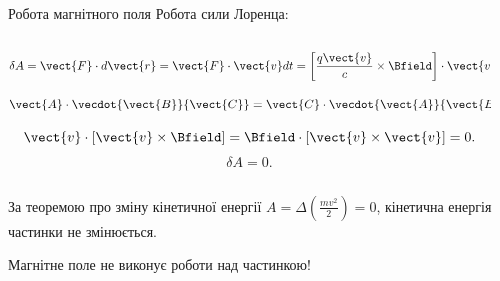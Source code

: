 \documentclass{beamer}
\begin{document}
\begin{frame}{Робота магнітного поля}{}
    Робота сили Лоренца:
        \begin{columns}
        	\begin{column}{0.65\linewidth}
         \begin{equation*}
            \delta A = \vect{F}\cdot d\vect{r} = \vect{F}\cdot\vect{v}dt = \left[\frac{q \vect{v}}{c}\times\Bfield\right] \cdot\vect{v}dt.
        \end{equation*}
        \begin{block}{}\scriptsize
            \begin{equation*}
                 \vect{A}\cdot\vecdot{\vect{B}}{\vect{C}} = \vect{C}\cdot\vecdot{\vect{A}}{\vect{B}}.
            \end{equation*}
        \end{block}
        \begin{equation*}
           \vect{v}\cdot\left[\vect{v}\times\Bfield\right] = \Bfield\cdot\left[\vect{v}\times\vect{v}\right] = 0.
        \end{equation*}
        \begin{equation*}
            \delta A = 0.
        \end{equation*}
	\end{column}
	\begin{column}{0.35\linewidth}\centering
	\end{column}
\end{columns}
\begin{block}{}
За теоремою про зміну кінетичної енергії $A = \Delta\left(\frac{mv^2}{2}\right) = 0$, кінетична енергія частинки не змінюється.
\end{block}
\begin{alertblock}{}\centering
    Магнітне поле не виконує роботи над частинкою!
\end{alertblock}
\end{frame}
\end{document}
